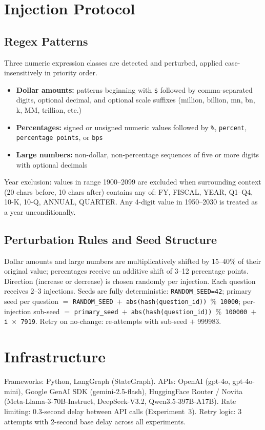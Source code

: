 \documentclass{article}
\theoremstyle{plain}
\theoremstyle{definition}
\theoremstyle{remark}
\begin{document}
\section{Injection Protocol}

\subsection{Regex Patterns}
Three numeric expression classes are detected and perturbed, applied case-insensitively in priority order.

\begin{itemize}[leftmargin=*]
  \item \textbf{Dollar amounts:} patterns beginning with \texttt{\$} followed by comma-separated digits, optional decimal, and optional scale suffixes (million, billion, mn, bn, k, MM, trillion, etc.)
  \item \textbf{Percentages:} signed or unsigned numeric values followed by \texttt{\%}, \texttt{percent}, \texttt{percentage points}, or \texttt{bps}
  \item \textbf{Large numbers:} non-dollar, non-percentage sequences of five or more digits with optional decimals
\end{itemize}

Year exclusion: values in range 1900--2099 are excluded when surrounding context (20 chars before, 10 chars after) contains any of: FY, FISCAL, YEAR, Q1--Q4, 10-K, 10-Q, ANNUAL, QUARTER. Any 4-digit value in 1950--2030 is treated as a year unconditionally. 


\subsection{Perturbation Rules and Seed Structure}
Dollar amounts and large numbers are multiplicatively shifted by 15--40\% of their original value; percentages receive an additive shift of 3--12 percentage points. Direction (increase or decrease) is chosen randomly per injection. Each question receives 2--3 injections. Seeds are fully deterministic: \texttt{RANDOM\_SEED=42}; primary seed per question $=$ \texttt{RANDOM\_SEED $+$ abs(hash(question\_id)) $\%$ 10000}; per-injection sub-seed $=$ \texttt{primary\_seed $+$ abs(hash(question\_id)) $\%$ 100000 $+$ i $\times$ 7919}. Retry on no-change: re-attempts with sub-seed $+$ 999983.



\section{Infrastructure}

Frameworks: Python, LangGraph (StateGraph). APIs: OpenAI (gpt-4o, gpt-4o-mini), Google GenAI SDK (gemini-2.5-flash), HuggingFace Router / Novita (Meta-Llama-3-70B-Instruct, DeepSeek-V3.2, Qwen3.5-397B-A17B). Rate limiting: 0.3-second delay between API calls (Experiment~3). Retry logic: 3 attempts with 2-second base delay across all experiments.
\end{document}
